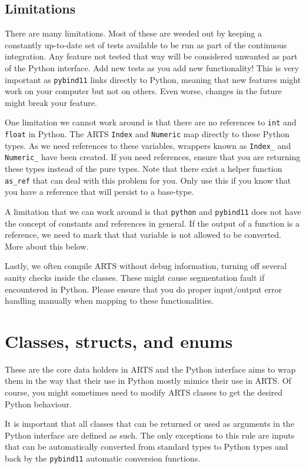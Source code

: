 \subsection{Limitations}
There are many limitations.  Most of these are weeded out by keeping a constantly up-to-date set of tests available to be run as part of the continuous
integration.  Any feature not tested that way will be considered unwanted as part of the Python interface.  Add new tests as you add new functionality!
This is very important as \verb|pybind11| links directly to Python, meaning that new features might work on your computer but not on others.  Even worse,
changes in the future might break your feature.

One limitation we cannot work around is that there are no references to \verb|int| and \verb|float| in Python.  The 
ARTS \verb|Index| and \verb|Numeric| map directly to these Python types.  As we need references to these variables,
wrappers known as \verb|Index_| and \verb|Numeric_| have been created.  If you need references, ensure that you are returning
these types instead of the pure types.  Note that there exist a helper function \verb|as_ref| that can deal with this problem
for you.  Only use this if you know that you have a reference that will persist to a base-type.

A limitation that we can work around is that \verb|python| and \verb|pybind11| does not have the concept of constants and
references in general.  If the output of a function is a reference, we need to mark that that variable is not allowed to
be converted.  More about this below.

Lastly, we often compile ARTS without debug information, turning off several sanity checks inside the classes.
These might cause segmentation fault if encountered in Python.  Please ensure that you do proper input/output
error handling manually when mapping to these functionalities.

\section{Classes, structs, and enums}
These are the core data holders in ARTS and the Python interface aims to wrap them in the way that their use in
Python mostly mimics their use in ARTS.  Of course, you might sometimes need to modify ARTS classes to get the
desired Python behaviour.

It is important that all classes that can be returned or used as arguments in the Python interface are defined as such.
The only exceptions to this rule are inputs that can be automatically converted from standard types to Python types
and back by the \verb|pybind11| automatic conversion functions.

